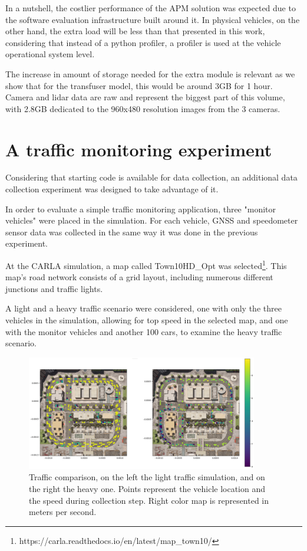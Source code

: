 In a nutshell, the costlier performance of the APM solution was expected due to the software evaluation infrastructure built around it. In physical vehicles, on the other hand, the extra load will be less than that presented in this work, considering that instead of a python profiler, a profiler is used at the vehicle operational system level.

The increase in amount of storage needed for the extra module is relevant as we show that for the transfuser model, this would be around 3GB for 1 hour. Camera and lidar data are raw and represent the biggest part of this volume, with 2.8GB dedicated to the 960x480 resolution images from the 3 cameras.

\section{A traffic monitoring experiment}

Considering that starting code is available for data collection, an additional data collection experiment was designed to take advantage of it.

In order to evaluate a simple traffic monitoring application, three "monitor vehicles" were placed in the simulation. For each vehicle, GNSS and speedometer sensor data was collected in the same way it was done in the previous experiment.

At the CARLA simulation, a map called Town10HD\_Opt was selected\footnote{https://carla.readthedocs.io/en/latest/map\_town10/}. This map's road network consists of a grid layout, including numerous different junctions and traffic lights.

A light and a heavy traffic scenario were considered, one with only the three vehicles in the simulation, allowing for top speed in the selected map, and one with the monitor vehicles and another 100 cars, to examine the heavy traffic scenario.

\begin{figure} [!ht]
    \centering
    \includegraphics[width=0.9\textwidth]{parts/figuras/traffic-comparison.pdf}
    \caption{Traffic comparison, on the left the light traffic simulation, and on the right the heavy one. Points represent the vehicle location and the speed during collection step. Right color map is represented in meters per second.}
    \label{fig:traffic-monitoring}
\end{figure}

